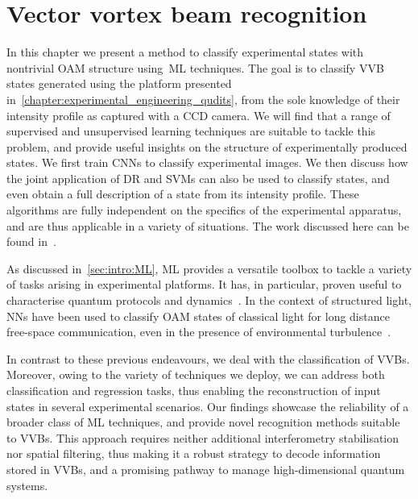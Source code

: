 
\chapter{Vector vortex beam recognition}
\label{chapter:ML_VVBs}

In this chapter we present a method to classify experimental states with nontrivial \ac{OAM} structure using~\acf{ML} techniques.
The goal is to classify \ac{VVB} states generated using the platform presented in~\cref{chapter:experimental_engineering_qudits}, from the sole knowledge of their intensity profile as captured with a CCD camera.
We will find that a range of supervised and unsupervised learning techniques are suitable to tackle this problem, and provide useful insights on the structure of experimentally produced states.
We first train \acp{CNN} to classify experimental images.
We then discuss how the joint application of \ac{DR} and \acp{SVM} can also be used to classify states, and even obtain a full description of a state from its intensity profile.
These algorithms are fully independent on the specifics of the experimental apparatus, and are thus applicable in a variety of situations.
The work discussed here can be found in~\cite{giordani2020machine}.

As discussed in~\cref{sec:intro:ML}, \ac{ML} provides a versatile toolbox to tackle a variety of tasks arising in experimental platforms. It has, in particular, proven useful to characterise quantum protocols and dynamics~\cite{carrasquilla2019reconstructing,giordani2018experimental, agresti2019pattern,lumino2018experimental,rocchetto2019experimental,butler2018machine,fischer2006predicting,melnikov2018active,wang2017experimental}.
In the context of structured light, \acp{NN} have been used to classify \ac{OAM} states of classical light for long distance free-space communication, even in the presence of environmental turbulence~\cite{krenn2014communication,krenn2016twisted,doster2017machine,park2018demultiplexing,lohani2018turbulence,li2018joint}.

In contrast to these previous endeavours, we deal with the classification of \acp{VVB}. Moreover, owing to the variety of techniques we deploy, we can address both classification and regression tasks, thus enabling the reconstruction of input states in several experimental scenarios.
Our findings showcase the reliability of a broader class of ML techniques, and provide novel recognition methods suitable to \acp{VVB}.
This approach requires neither additional interferometry stabilisation nor spatial filtering, thus making it a robust strategy to decode information stored in \acp{VVB}, and a promising pathway to manage high-dimensional quantum systems. 

